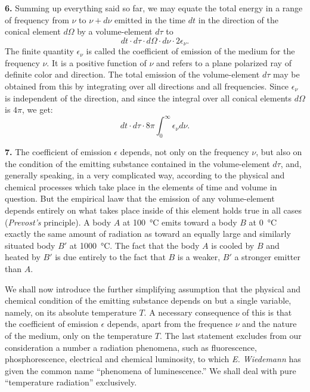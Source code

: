 \documentclass[12pt,oneside]{book}
\begin{document}
\textbf{6.} Summing up everything said so far, we may equate the total energy in a range of frequency from $\nu$ to $\nu+d\nu$ emitted in the time $dt$ in the direction of the conical element $d\Omega$ by a volume-element $d\tau$ to 
\begin{equation}
    dt\cdot d\tau\cdot d\Omega\cdot d\nu\cdot 2\epsilon_\nu.
    \label{eq1}
\end{equation}
The finite quantity $\epsilon_\nu$ is called the coefficient of emission of the medium for the frequency $\nu$. It is a positive function of $\nu$ and refers to a plane polarized ray of definite color and direction. The total emission of the volume-element $d\tau$ may be obtained from this by integrating over all directions and all frequencies. Since $\epsilon_\nu$ is independent of the direction, and since the integral over all conical elements $d\Omega$ is $4\pi$, we get:
\begin{equation}
    dt\cdot d\tau\cdot 8\pi\int_0^\infty\epsilon_\nu d\nu.
    \label{eq2}
\end{equation} \par 

\textbf{7.} The coefficient of emission $\epsilon$ depends, not only on the frequency $\nu$, but also on the condition of the emitting substance contained in the volume-element $d\tau$, and, generally speaking, in a very complicated way, according to the physical and chemical processes which take place in the elements of time and volume in question. But the empirical laaw that the emission of any volume-element depends entirely on what takes place inside of this element holds true in all cases (\textit{Prevost's} principle). A body $A$ at \SI{100}{\degreeCelsius} emits toward a body $B$ at \SI{0}{\degreeCelsius} exactly the same amount of radiation as toward an equally large and similarly situated body $B'$ at \SI{1000}{\degreeCelsius}. The fact that the body $A$ is cooled by $B$ and heated by $B'$ is due entirely to the fact that $B$ is a weaker, $B'$ a stronger emitter than $A$. \par 

We shall now introduce the further simplifying assumption that the physical and chemical condition of the emitting substance depends on but a single variable, namely, on its absolute temperature $T$. A necessary consequence of this is that the coefficient of emission $\epsilon$ depends, apart from the frequence $\nu$ and the nature of the medium, only on the temperature $T$. The last statement excludes from our consideration a number a radiation phenomena, such as fluorescence, phosphorescence, electrical and chemical luminosity, to which \textit{E. Wiedemann} has given the common name ``phenomena of luminescence.'' We shall deal with pure ``temperature radiation'' exclusively. \par 
\end{document}
